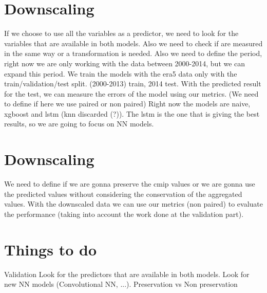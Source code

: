 \documentclass[xcolor=dvipsnames]{beamer}
\begin{document}
    \section{Downscaling}

    \begin{frame}
        \begin{outline}
            \1  If we choose to use all the variables as a predictor, we need to look for the variables that are available in both models. Also we need to check if are measured in the same way or a transformation is needed. Also we need to define the period, right now we are only working with the data between 2000-2014, but we can expand this period.
            \1 We train the models with the era5 data only with the train/validation/test split. (2000-2013) train, 2014 test.
            \1 With the predicted result for the test, we can measure the errors of the model using our metrics. (We need to define if here we use paired or non paired) 
            \1 Right now the models are naive, xgboost and lstm (knn discarded (?)). The lstm is the one that is giving the best results, so we are going to focus on NN models.
           \end{outline}
    \end{frame}

    \section{Downscaling}

    \begin{frame}
        \begin{outline}
            \1 We need to define if we are gonna preserve the cmip values or we are gonna use the predicted values without considering the conservation of the aggregated values.
            \1 With the downscaled data we can use our metrics (non paired) to evaluate the performance (taking into account the work done at the validation part).
        \end{outline}
    \end{frame}

    \section{Things to do}
    \begin{frame}
        \begin{outline}
            \1 Validation
            \1 Look for the predictors that are available in both models.
            \1 Look for new NN models (Convolutional NN, ...).
            \1 Preservation vs Non preservation
        \end{outline}
    \end{frame}
    
\end{document}
